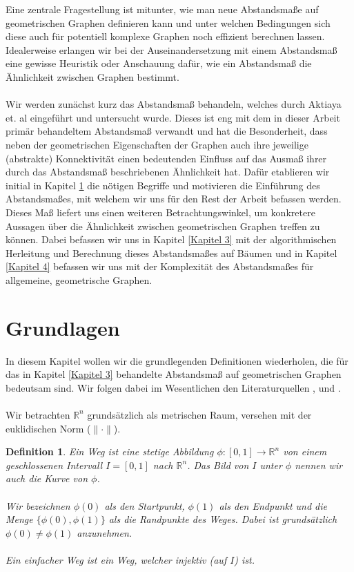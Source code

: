 \documentclass[a4paper, 12pt, twoside]{article}
\theoremstyle{Format1} %
\newtheorem{Def}{Definition}[section]       %
\begin{document}
Eine zentrale Fragestellung ist mitunter, wie man neue Abstandsmaße auf geometrischen Graphen definieren kann und unter welchen Bedingungen sich diese auch für potentiell
komplexe Graphen noch effizient berechnen lassen.
Idealerweise erlangen wir bei der Auseinandersetzung mit einem Abstandsmaß eine gewisse Heuristik oder Anschauung dafür, wie ein Abstandsmaß die Ähnlichkeit zwischen Graphen bestimmt.
\\
\\
Wir werden zunächst kurz das Abstandsmaß behandeln, welches durch Aktiaya et. al \cite{Akitaya} eingeführt und untersucht wurde.
Dieses ist eng mit dem in dieser Arbeit primär behandeltem Abstandsmaß verwandt und hat die Besonderheit, dass neben der geometrischen Eigenschaften
der Graphen auch ihre jeweilige (abstrakte) Konnektivität einen bedeutenden Einfluss auf das Ausmaß ihrer durch das Abstandsmaß beschriebenen Ähnlichkeit hat.
Dafür etablieren wir initial in Kapitel \ref{Kapitel 2} die nötigen Begriffe und
motivieren die Einführung des Abstandsmaßes, mit welchem wir uns für den Rest der Arbeit befassen werden.
Dieses Maß liefert uns einen weiteren Betrachtungswinkel, um konkretere Aussagen
über die Ähnlichkeit zwischen geometrischen Graphen treffen zu können.
Dabei befassen wir uns in Kapitel \ref{Kapitel 3} mit der algorithmischen Herleitung und Berechnung dieses Abstandsmaßes auf Bäumen und in Kapitel \ref{Kapitel 4} befassen wir uns mit der
Komplexität des Abstandsmaßes für allgemeine, geometrische Graphen.
\newpage

\section{Grundlagen} \label{Kapitel 2}
In diesem Kapitel wollen wir die grundlegenden Definitionen wiederholen, die für das in Kapitel \ref{Kapitel 3} behandelte Abstandsmaß auf
geometrischen Graphen bedeutsam sind. Wir folgen dabei im Wesentlichen den Literaturquellen \cite{Buchin}, \cite{Akitaya} und \cite{Alt}.
\\
\\
Wir betrachten $ \mathbb{R}^n $ grundsätzlich als metrischen Raum, versehen mit der euklidischen Norm ($\| \cdot \|$).

\begin{Def}
	Ein \textit{Weg} ist eine stetige Abbildung $ \phi: [0,1] \to \mathbb{R}^n $ von einem geschlossenen Intervall $I = [0,1]$ nach $\mathbb{R}^n$.
	Das Bild von $I$ unter $\phi$ nennen wir auch die \textit{Kurve} von $\phi$.
	\\
	\\
	Wir bezeichnen $\phi(0)$ als den \textit{Startpunkt}, $\phi(1)$ als den \textit{Endpunkt} und die Menge
	$\{\phi(0), \phi(1)\}$ als die \textit{Randpunkte} des Weges. Dabei ist grundsätzlich $\phi(0) \neq \phi(1)$ anzunehmen.
	\\
	\\
	Ein \textit{einfacher Weg} ist ein Weg, welcher injektiv (auf $I$) ist.
\end{Def}
\end{document}
